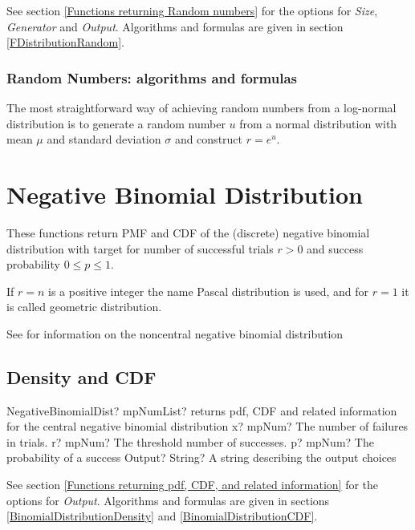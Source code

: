 \vspace{0.3cm}

See section \ref{Functions returning Random numbers} for the options for  {\itshape\sffamily Size},  {\itshape\sffamily Generator} and {\itshape\sffamily Output}. Algorithms and formulas are given in section \ref{FDistributionRandom}.


\subsubsection{Random Numbers: algorithms and formulas}
The most straightforward way of achieving random numbers from a log-normal distribution is to generate a random number $u$ from a normal distribution with mean $\mu$ and standard deviation $\sigma$ and construct $r = e^u$.




\section{Negative Binomial Distribution}
\label{NegativBinomialDistribution}

These functions return PMF and CDF of the (discrete) negative binomial distribution with target for number of successful trials $r > 0$ and success probability $0 \leq  p \leq 1$.

If $r = n$ is a positive integer the name Pascal distribution is used, and for $r = 1$ it is called geometric distribution.

See \cite{ong_non-central_1979} for information on the noncentral negative binomial distribution

\subsection{Density and CDF}

\begin{mpFunctionsExtract}
	\mpFunctionFour
	{NegativeBinomialDist? mpNumList? returns pdf, CDF and related information for the central negative binomial distribution}
	{x? mpNum? The number of failures in trials.}
	{r? mpNum? The threshold number of successes.}
	{p? mpNum? The probability of a success}
	{Output? String? A string describing the output choices}
\end{mpFunctionsExtract}


\vspace{0.3cm}
See section \ref{Functions returning pdf, CDF, and related information} for the options for {\itshape\sffamily Output}. Algorithms and formulas are given in sections \ref{BinomialDistributionDensity} and \ref{BinomialDistributionCDF}.


